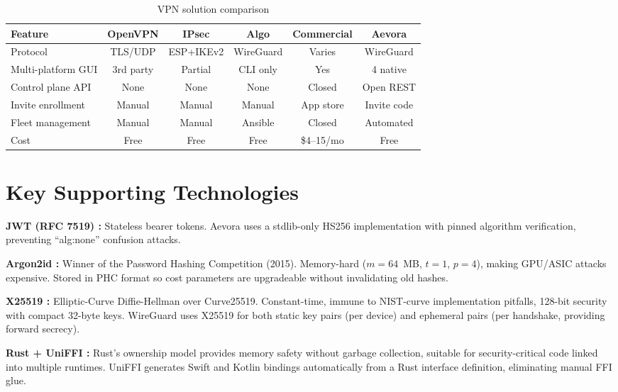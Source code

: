 \documentclass[12pt,a4paper]{report}
\begin{document}
\begin{table}[H]
\centering\small
\caption{VPN solution comparison}
\label{tab:vpn_cmp}
\begin{tabular}{lccccc}
\toprule
\textbf{Feature} & \textbf{OpenVPN} & \textbf{IPsec} & \textbf{Algo} & \textbf{Commercial} & \textbf{Aevora}\\
\midrule
Protocol & TLS/UDP & ESP+IKEv2 & WireGuard & Varies & WireGuard\\
Multi-platform GUI & 3rd party & Partial & CLI only & Yes & 4 native\\
Control plane API & None & None & None & Closed & Open REST\\
Invite enrollment & Manual & Manual & Manual & App store & Invite code\\
Fleet management & Manual & Manual & Ansible & Closed & Automated\\
Cost & Free & Free & Free & \$4--15/mo & Free\\
\bottomrule
\end{tabular}
\end{table}

\section{Key Supporting Technologies}

\textbf{JWT (RFC 7519) \cite{rfc7519}:} Stateless bearer tokens. Aevora uses a stdlib-only HS256 implementation with pinned algorithm verification, preventing ``alg:none'' confusion attacks.

\textbf{Argon2id \cite{biryukov2016argon2}:} Winner of the Password Hashing Competition (2015). Memory-hard ($m{=}64$~MB, $t{=}1$, $p{=}4$), making GPU/ASIC attacks expensive. Stored in PHC format so cost parameters are upgradeable without invalidating old hashes.

\textbf{X25519 \cite{bernstein2006curve25519}:} Elliptic-Curve Diffie-Hellman over Curve25519. Constant-time, immune to NIST-curve implementation pitfalls, 128-bit security with compact 32-byte keys. WireGuard uses X25519 for both static key pairs (per device) and ephemeral pairs (per handshake, providing forward secrecy).

\textbf{Rust + UniFFI \cite{rust_lang,uniffi}:} Rust's ownership model provides memory safety without garbage collection, suitable for security-critical code linked into multiple runtimes. UniFFI generates Swift and Kotlin bindings automatically from a Rust interface definition, eliminating manual FFI glue.
\end{document}
